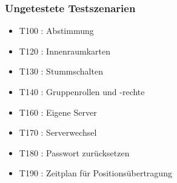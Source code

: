 \documentclass[parskip=full,11pt]{scrartcl}
\begin{document}
	\subsubsection{Ungetestete Testszenarien}
	\begin{itemize}
		\item T100 : Abstimmung
		\item T120 : Innenraumkarten
		\item T130 : Stummschalten
		\item T140 : Gruppenrollen und -rechte
		\item T160 : Eigene Server
		\item T170 : Serverwechsel
		\item T180 : Passwort zurücksetzen
		\item T190 : Zeitplan für Positionsübertragung
	\end{itemize}
\end{document}
